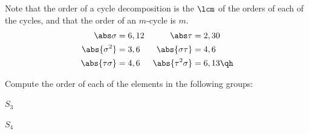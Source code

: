 \begin{sol}
    Note that the order of a cycle decomposition is the $\lcm$ of the orders of each of the cycles, and that the order of an $m$-cycle is $m$.
    \begin{align*}
        \abs\sigma & = 6, 12 & \abs\tau & = 2, 30 \\
        \abs{\sigma^2} & = 3, 6 & \abs{\sigma\tau} & = 4, 6 \\
        \abs{\tau\sigma} & = 4, 6 & \abs{\tau^2\sigma} & = 6, 13 \qh
    \end{align*}
\end{sol}

\begin{exercise} \label{ex1.3.4}
    Compute the order of each of the elements in the following groups:
    \begin{subproblems}
        \item $S_3$
        \item $S_4$
    \end{subproblems}
\end{exercise}

